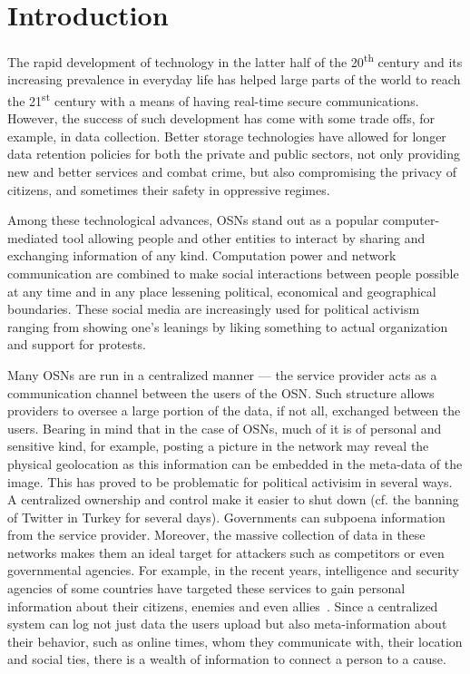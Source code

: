 \section{Introduction}
\label{Introduction}
The rapid development of technology in the latter half of the
20\textsuperscript{th} century and its increasing prevalence in
everyday life has helped large parts of the world to reach the
21\textsuperscript{st} century with a means of having real-time secure
communications.  However, the success of such development has come
with some trade offs, for example, in data collection. Better storage
technologies have allowed for longer data retention policies for both
the private and public sectors, not only providing new and better
services and combat crime, but also compromising the privacy of
citizens, and sometimes their safety in oppressive regimes.

Among these technological advances, \acp{OSN} stand out as a popular
computer-mediated tool allowing people and other entities to interact
by sharing and exchanging information of any kind. Computation power
and network communication are combined to make social interactions
between people possible at any time and in any place lessening
political, economical and geographical boundaries. These social media
are increasingly used for political activism ranging from showing
one's leanings by liking something to actual organization and support for
protests.

Many \acp{OSN} are run in a centralized manner --- the service
provider acts as a communication channel between the users of the
\ac{OSN}. Such structure allows providers to oversee a large portion
of the data, if not all, exchanged between the users. Bearing in mind
that in the case of \acp{OSN}, much of it is of personal and sensitive
kind, for example, posting a picture in the network may reveal the
physical geolocation as this information can be embedded in the
meta-data of the image. This has proved to be problematic for
political activisim in several ways. A centralized ownership and
control make it easier to shut down (cf. the banning of Twitter in
Turkey for several days). Governments can subpoena 
information from the service provider.  Moreover, the massive
collection of data in these networks makes them an ideal target for
attackers such as competitors or even governmental agencies. For
example, in the recent years, intelligence and security agencies of
some countries have targeted these services to gain personal
information about their citizens, enemies and even
allies~\cite{Prism}. Since a centralized system can log not just data
the users upload but also meta-information about their behavior, such
as online times, whom they communicate with, their location and social
ties, there is a wealth of information to connect a person to a cause.

